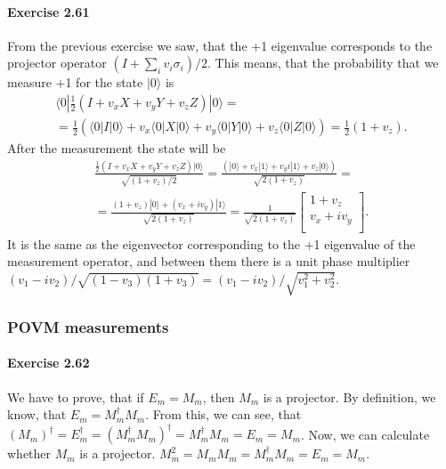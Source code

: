 \documentclass[a4paper,12pt]{article}
\newcommand{\exercise}[1]{\paragraph{Exercise #1}}
\newcommand{\la}{\langle}
\newcommand{\ra}{\rangle}
\begin{document}
    \exercise{2.61} From the previous exercise we saw, that the +1 eigenvalue corresponds to the projector operator $(I + \sum_i v_i \sigma_i)/2$. This means, that the probability that we measure +1 for the state $|0 \ra$ is
    \begin{gather}
        \nonumber
        \la 0 | \frac{1}{2} (I + v_x X + v_y Y + v_z Z) | 0 \ra =\\
        = \frac{1}{2}(\la 0 | I | 0 \ra + v_x \la 0 | X | 0 \ra + v_y \la 0 | Y | 0 \ra + v_z \la 0 | Z | 0 \ra) = \frac{1}{2}(1 + v_z) \textrm{.}
    \end{gather}
    After the measurement the state will be
    \begin{gather}
        \nonumber
        \frac{\frac{1}{2}(I + v_x X + v_y Y + v_z Z) | 0 \ra}{\sqrt{(1 + v_z)/2}} =
        \frac{(|0\ra + v_x |1\ra + v_y i |1\ra + v_z |0\ra)}{\sqrt{2(1 + v_z)}} =\\
        = \frac{(1 + v_z)|0\ra + (v_x + i v_y) |1\ra}{\sqrt{2(1 + v_z)}} =
        \frac{1}{\sqrt{2(1 + v_z)}}
        \begin{bmatrix}
            1 + v_z\\
            v_x + i v_y\\
        \end{bmatrix}
        \textrm{.}
    \end{gather}
    It is the same as the eigenvector corresponding to the +1 eigenvalue of the measurement operator, and between them there is a unit phase multiplier $(v_1 - i v_2)/\sqrt{(1 - v_3)(1 + v_3)} = (v_1 - i v_2)/\sqrt{v_1^2 + v_2^2}$.

    \subsubsection{POVM measurements}

    \exercise{2.62} We have to prove, that if $E_m = M_m$, then $M_m$ is a projector. By definition, we know, that $E_m = M_m^\dagger M_m$. From this, we can see, that $(M_m)^\dagger = E_m^\dagger = (M_m^\dagger M_m)^\dagger = M_m^\dagger M_m = E_m = M_m$. Now, we can calculate whether $M_m$ is a projector. $M_m^2 = M_m M_m = M_m^\dagger M_m = E_m = M_m$.
\end{document}
